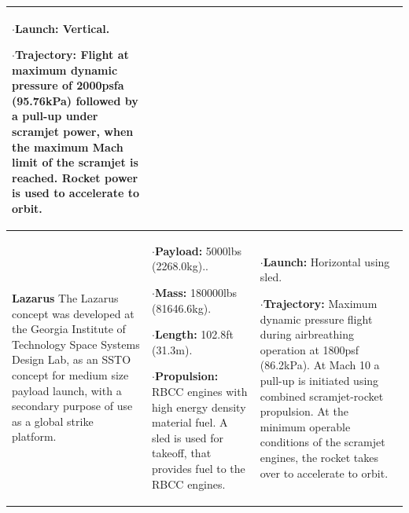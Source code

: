 {\begin{landscape}
\begin{xltabular}{\linewidth}{|X|X|X|}
$\cdot$\textbf{Launch:} Vertical. 

$\cdot$\textbf{Trajectory:} Flight at maximum dynamic pressure of 2000psfa (95.76kPa) followed by a pull-up under scramjet power, when the maximum Mach limit of the scramjet is reached. Rocket power is used to accelerate to orbit. 
 \\
\hline \small\textbf{Lazarus}\cite{Young2006} \newline \newline 
The Lazarus concept was developed at the Georgia Institute of Technology Space Systems Design Lab, as an SSTO concept for medium size payload launch, with a secondary purpose of use as a global strike platform. 

&\small {}  

$\cdot$\textbf{Payload:} 5000lbs (2268.0kg)..

$\cdot$\textbf{Mass:} 180000lbs (81646.6kg).

$\cdot$\textbf{Length:} 102.8ft (31.3m). 


$\cdot$\textbf{Propulsion:} RBCC engines with high energy density material fuel. A sled is used for takeoff, that provides fuel to the RBCC engines. 

&\small {}

$\cdot$\textbf{Launch:} Horizontal using sled.

$\cdot$\textbf{Trajectory:} Maximum dynamic pressure flight during airbreathing operation at 1800psf (86.2kPa). At Mach 10 a pull-up is initiated using combined scramjet-rocket propulsion. At the minimum operable conditions of the scramjet engines, the rocket takes over to accelerate to orbit. 


\end{xltabular}
\end{landscape}}
